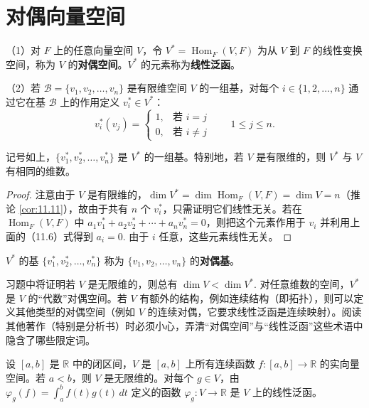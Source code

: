 \section{对偶向量空间}

\begin{definition}
（1）对 \(F\) 上的任意向量空间 \(V\)，令 \(V^* = \operatorname{Hom}_F(V, F)\) 为从 \(V\) 到 \(F\) 的线性变换空间，称为 \(V\) 的\textbf{对偶空间}。\(V^*\) 的元素称为\textbf{线性泛函}。

（2）若 \(\mathcal{B} = \{v_1, v_2, \ldots, v_n\}\) 是有限维空间 \(V\) 的一组基，对每个 \(i \in \{1, 2, \ldots, n\}\) 通过它在基 \(\mathcal{B}\) 上的作用定义 \(v_i^* \in V^*\)：
\begin{equation}
v_i^*(v_j) = \begin{cases} 1, & \text{若 } i = j \\ 0, & \text{若 } i \neq j \end{cases} \qquad 1 \leq j \leq n. \tag{11.6}
\end{equation}
\end{definition}

\begin{proposition}\label{pro:11.18}
记号如上，\(\{v_1^*, v_2^*, \ldots, v_n^*\}\) 是 \(V^*\) 的一组基。特别地，若 \(V\) 是有限维的，则 \(V^*\) 与 \(V\) 有相同的维数。
\end{proposition}

\begin{proof}
注意由于 \(V\) 是有限维的，\(\dim V^* = \dim\operatorname{Hom}_F(V, F) = \dim V = n\)（推论 \ref{cor:11.11}），故由于共有 \(n\) 个 \(v_i^*\)，只需证明它们线性无关。若在 \(\operatorname{Hom}_F(V, F)\) 中 \(a_1v_1^*+a_2v_2^*+\cdots+a_nv_n^* = 0\)，则把这个元素作用于 \(v_i\) 并利用上面的（11.6）式得到 \(a_i = 0\). 由于 \(i\) 任意，这些元素线性无关。
\end{proof}

\begin{definition}
\(V^*\) 的基 \(\{v_1^*, v_2^*, \ldots, v_n^*\}\) 称为 \(\{v_1, v_2, \ldots, v_n\}\) 的\textbf{对偶基}。
\end{definition}

习题中将证明若 \(V\) 是无限维的，则总有 \(\dim V < \dim V^*\). 对任意维数的空间，\(V^*\) 是 \(V\) 的“代数”对偶空间。若 \(V\) 有额外的结构，例如连续结构（即拓扑），则可以定义其他类型的对偶空间（例如 \(V\) 的连续对偶，它要求线性泛函是连续映射）。阅读其他著作（特别是分析书）时必须小心，弄清“对偶空间”与“线性泛函”这些术语中隐含了哪些限定词。

\begin{example}
设 \([a, b]\) 是 \(\mathbb{R}\) 中的闭区间，\(V\) 是 \([a, b]\) 上所有连续函数 \(f : [a, b] \to \mathbb{R}\) 的实向量空间。若 \(a < b\)，则 \(V\) 是无限维的。对每个 \(g \in V\)，由 \(\varphi_g(f) = \int_a^b f(t)g(t)\,dt\) 定义的函数 \(\varphi_g : V \to \mathbb{R}\) 是 \(V\) 上的线性泛函。
\end{example}

